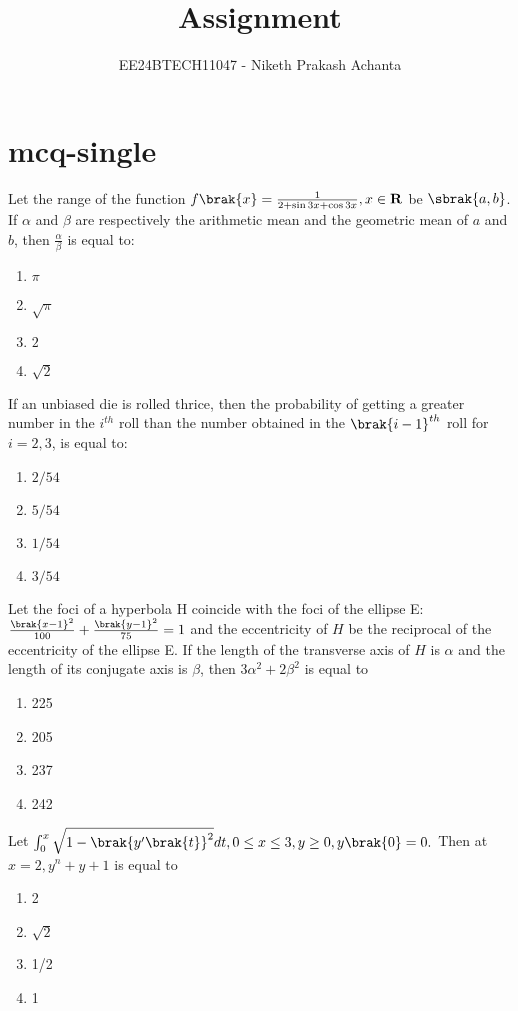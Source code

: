 \ifflase
\title{Assignment}
\author{EE24BTECH11047 - Niketh Prakash Achanta}
\section{mcq-single}
\fi
    \item Let the range of the function $f\brak{x}=\frac{1}{2+\sin{3x}+\cos{3x}},x\in\mathbf{R}$ be $\sbrak{a, b}$. If $\alpha$ and $\beta$ are respectively the arithmetic mean and the geometric mean of $a$ and $b$, then $\frac{\alpha}{\beta}$ is equal to:
    \begin{enumerate}
        \item $\pi$
        \item $\sqrt{\pi}$
        \item $2$
        \item $\sqrt{2}$
    \end{enumerate}
    \item If an unbiased die is rolled thrice, then the probability of getting a greater number in the $i^{th}$ roll than the number obtained in the $\brak{i-1}^{th}$ roll for $i = 2, 3$, is equal to:
    \begin{enumerate}
        \item $2/54$
        \item $5/54$
        \item $1/54$
        \item $3/54$
    \end{enumerate}
    \item Let the foci of a hyperbola H coincide with the foci of the ellipse E:$\frac{\brak{x-1}^2}{100} + \frac{\brak{y-1}^2}{75} = 1$ and the eccentricity of $H$ be the reciprocal of the eccentricity of the ellipse E. If the length of the transverse axis of $H$ is $\alpha$ and the length of its conjugate axis is $\beta$, then $3\alpha^2 + 2\beta^2$ is equal to
    \begin{enumerate}
        \item 225
        \item 205
        \item 237
        \item 242
    \end{enumerate}
    \item Let $\int_0^x\sqrt{1-\brak{y^{\prime}\brak{t}}^2}dt, 0\leq x \leq 3,y\geq 0,y\brak{0}=0.$ Then at $x=2,y^n+y+1$ is equal to
    \begin{enumerate}
        \item 2
        \item $\sqrt{2}$
        \item 1/2
        \item 1
    \end{enumerate}
